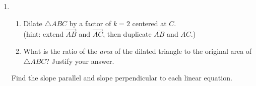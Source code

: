 \documentclass[12pt, oneside]{article}
\begin{document}
\begin{enumerate}
  \item
  \begin{enumerate}
    \item Dilate $\triangle ABC$ by a factor of $k=2$ centered at $C$.\\[0.25cm]
  (hint: extend $\overrightarrow{AB}$ and $\overrightarrow{AC}$, then duplicate $\overline{AB}$ and $\overline{AC}$.) \vspace{1cm}
    \begin{center}
       \vspace{4cm}
    \end{center}
    \item What is the ratio of the \emph{area} of the dilated triangle to the original area of $\triangle ABC$? Justify your answer.
  \end{enumerate}

\newpage

Find the slope parallel and slope perpendicular to each linear equation.


\end{enumerate}
\end{document}

